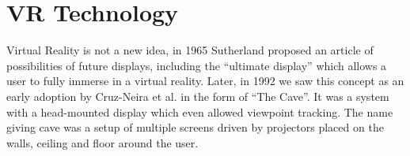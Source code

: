 




\section{VR Technology}

Virtual Reality is not a new idea, in 1965 Sutherland \cite{Sutherland65theultimate} proposed an article of possibilities of future displays, including the “ultimate display” which allows a user to fully immerse in a virtual reality. Later, in 1992 we saw this concept as an early adoption by Cruz-Neira et al. \cite{cruz-neira_cave_1992} in the form of “The Cave”. It was a system with a head-mounted display which even allowed viewpoint tracking. The name giving cave was a setup of multiple screens driven by projectors placed on the walls, ceiling and floor around the user.


